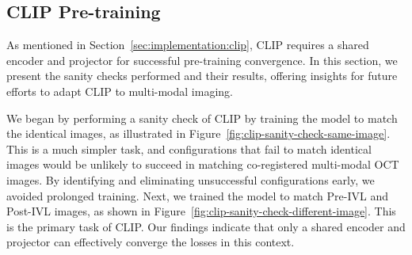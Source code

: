 \documentclass[a4paper,11pt,oneside]{report}
\begin{document}
\subsection{CLIP Pre-training}\label{sec:results:discussion:clip}
As mentioned in Section~\ref{sec:implementation:clip}, CLIP requires a shared encoder and projector for successful pre-training convergence. In this section, we present the sanity checks performed and their results, offering insights for future efforts to adapt CLIP to multi-modal imaging.

We began by performing a sanity check of CLIP by training the model to match the identical images, as illustrated in Figure~\ref{fig:clip-sanity-check-same-image}. This is a much simpler task, and configurations that fail to match identical images would be unlikely to succeed in matching co-registered multi-modal OCT images. By identifying and eliminating unsuccessful configurations early, we avoided prolonged training. Next, we trained the model to match Pre-IVL and Post-IVL images, as shown in Figure~\ref{fig:clip-sanity-check-different-image}. This is the primary task of CLIP. Our findings indicate that only a shared encoder and projector can effectively converge the losses in this context.
\end{document}
